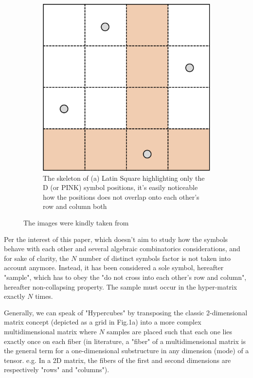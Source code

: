 \documentclass[12pt]{article}
\newcommand{\midcaption}[1]{
    \captionsetup{justification=centering}
    \caption{#1}
}
\begin{document}
\begin{figure}[h]
\begin{subfigure}[b]{0.45\textwidth}
{        	\includegraphics[width=\textwidth]{src/imgs/latin_square_skeleton.png}
        	\caption{The skeleton of (a) Latin Square highlighting only the D (or PINK) symbol positions, it's easily noticeable how the positions does not overlap onto each other's row and column both}
        	\label{fig:latin_square_b}
        }
    \end{subfigure}
    
    \midcaption{The images were kindly taken from \fancycite{sheikholeslami2017}}
    \label{fig:latin_square}
\end{figure}

Per the interest of this paper, which doesn't aim to study how the symbols behave with each other and several algebraic combinatorics considerations, and for sake of clarity, the $N$ number of distinct symbols factor is not taken into account anymore. Instead, it has been considered a sole symbol, hereafter "sample", which has to obey the "do not cross into each other's row and column", hereafter non-collapsing property. The sample must occur in the hyper-matrix exactly $N$ times.

Generally, we can speak of "Hypercubes" by transposing the classic 2-dimensional matrix concept (depicted as a grid in Fig.1a) into a more complex multidimensional matrix where $N$ samples are placed such that each one lies exactly once on each fiber (in literature, a "fiber" of a multidimensional matrix is the general term for a one-dimensional substructure in any dimension (mode) of a tensor. e.g. In a 2D matrix, the fibers of the first and second dimensions are respectively "rows" and "columns").
\end{document}
